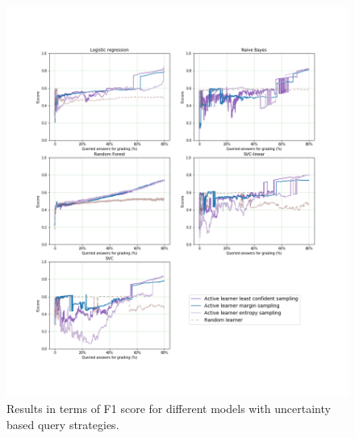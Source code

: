 \begin{figure}[!htb]
	\centering
	\includegraphics[scale=0.45]{images/task7_f1score_uncertainty}
	\caption{Results in terms of F1 score for different models with uncertainty based query strategies.}
	\label{t7_m_uncertainty_f1}
\end{figure}


